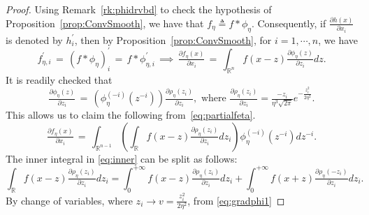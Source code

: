 \documentclass[11pt,reqno]{amsart}
\newcommand{\1}{{\bf 1}}
\newcommand{\2}{{\bf 2}}
\newcommand{\us}[1]{\textcolor{red}{#1}}
\numberwithin{equation}{section}
\theoremstyle{remark}
\begin{document}
		\begin{proof}
		Using Remark~\ref{rk:phidrvbd} to check the hypothesis of Proposition~\ref{prop:ConvSmooth}, we have that $f_{\eta} \triangleq f * \phi_{\eta}$. Consequently, if $\tfrac{\partial h(x)}{\partial x_i}$ is denoted by $h^{\prime}_i$, then by Proposition~\ref{prop:ConvSmooth}, for $i = 1, \cdots, n$, we have 
		\begin{equation}\label{eq:partialfeta}
			f_{\eta,i}^{\prime} \, = \, \left( f * \phi_{\eta} \right)_i^{\prime}  \, = \, f *  \phi_{\eta,i}^{\prime}
			\, \implies \, \tfrac{\partial f_{\eta}(x)}{\partial x_i} \, = \, \int_{\mathbb{R}^n} f(x - z) \tfrac{\partial\phi_{\eta}(z)}{\partial z_i}  dz.
		\end{equation}
		It is readily checked that 
		\begin{equation}\label{eq:gradphi1}
			\tfrac{\partial \phi_\eta(z)}{\partial z_i} \, = \, \left(\phi_\eta^{(-i)}\left(z^{-i}\right)\right)\tfrac{\partial \rho_\eta(z_i)}{\partial z_i},   \text{ where } \tfrac{\partial\rho_\eta(z_i)}{\partial z_i}= \tfrac{-z_i}{\eta^3\sqrt{2 \pi}}e^{-\frac{z_i^2}{2\eta^2}}.
		\end{equation}
		This allows us to claim the following from~\eqref{eq:partialfeta}. %
		\begin{equation}\label{eq:inner}
			\tfrac{\partial f_{\eta}(x)}{\partial x_i} \, = \,\int_{\mathbb{R}^{n-1}}\left(\int_{\mathbb{R}} f(x-z) \tfrac{\partial{\rho_\eta}(z_i)}{\partial z_i} dz_i\right) \phi_{\eta}^{(-i)}\left(z^{-i}\right)dz^{-i}.
		\end{equation}
		The inner integral in \eqref{eq:inner} can be split as follows:
		\begin{equation}\label{eq:split}
			\int_{\mathbb{R}} f(x-z) \tfrac{\partial{\rho_\eta}(z_i)}{\partial z_i}dz_i=\int_{0}^{+\infty} f(x-z) \tfrac{\partial{\rho_\eta}(z_i)}{\partial z_i} dz_i + \int_{0}^{+\infty} f(x+z) \tfrac{\partial{\rho_\eta}(-z_i)}{\partial z_i} dz_i.
		\end{equation}
		By change of variables, where $z_i \rightarrow v=\frac{z_i^2}{2\eta^2}$, from \eqref{eq:gradphi1}

\end{proof}
\end{document}
